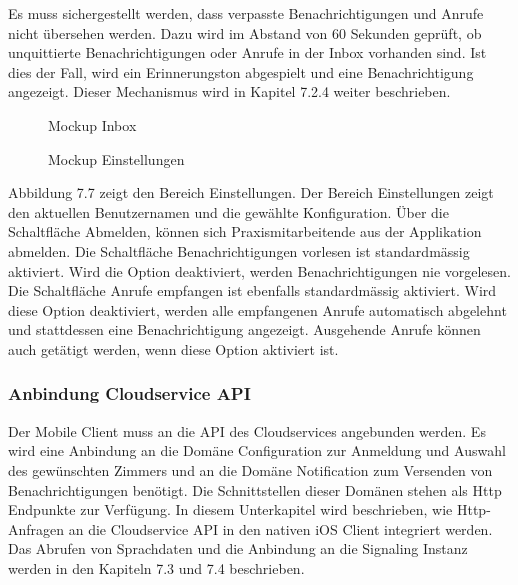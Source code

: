 Es muss sichergestellt werden, dass verpasste Benachrichtigungen und Anrufe nicht übersehen werden.
Dazu wird im Abstand von 60 Sekunden geprüft, ob unquittierte Benachrichtigungen oder Anrufe in der Inbox vorhanden sind.
Ist dies der Fall, wird ein Erinnerungston abgespielt und eine Benachrichtigung angezeigt.
Dieser Mechanismus wird in Kapitel 7.2.4 weiter beschrieben.

\begin{figure}[h]
    \centering
    \begin{minipage}[b]{0.4\textwidth}
        \caption{Mockup Inbox}
    \end{minipage}
    \hfill
    \begin{minipage}[b]{0.4\textwidth}
        \caption{Mockup Einstellungen}
    \end{minipage}\label{fig:Mockups-Inbox-Settings}
\end{figure}

Abbildung 7.7 zeigt den Bereich Einstellungen.
Der Bereich Einstellungen zeigt den aktuellen Benutzernamen und die gewählte Konfiguration.
Über die Schaltfläche Abmelden, können sich Praxismitarbeitende aus der Applikation abmelden.
Die Schaltfläche Benachrichtigungen vorlesen ist standardmässig aktiviert.
Wird die Option deaktiviert, werden Benachrichtigungen nie vorgelesen.
Die Schaltfläche Anrufe empfangen ist ebenfalls standardmässig aktiviert.
Wird diese Option deaktiviert, werden alle empfangenen Anrufe automatisch abgelehnt und stattdessen eine Benachrichtigung angezeigt.
Ausgehende Anrufe können auch getätigt werden, wenn diese Option aktiviert ist.

\subsubsection{Anbindung Cloudservice API}

Der Mobile Client muss an die API des Cloudservices angebunden werden.
Es wird eine Anbindung an die Domäne Configuration zur Anmeldung und Auswahl des gewünschten Zimmers und an die Domäne Notification zum Versenden von Benachrichtigungen benötigt.
Die Schnittstellen dieser Domänen stehen als Http Endpunkte zur Verfügung.
In diesem Unterkapitel wird beschrieben, wie Http-Anfragen an die Cloudservice API in den nativen iOS Client integriert werden.
Das Abrufen von Sprachdaten und die Anbindung an die Signaling Instanz werden in den Kapiteln 7.3 und 7.4 beschrieben.

